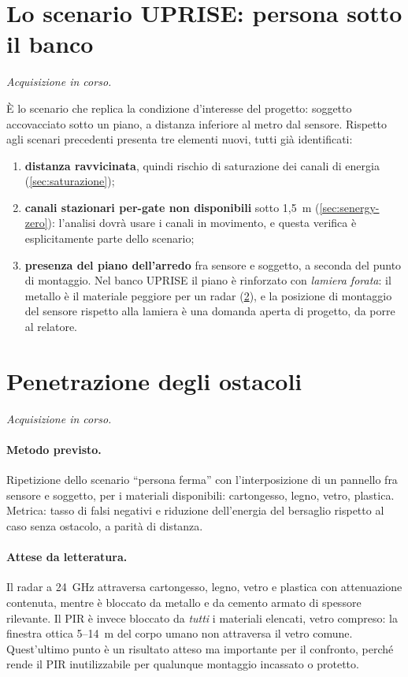 \section{Lo scenario UPRISE: persona sotto il banco}
\label{sec:sotto-banco}

\emph{Acquisizione in corso.}

È lo scenario che replica la condizione d'interesse del progetto: soggetto
accovacciato sotto un piano, a distanza inferiore al metro dal sensore. Rispetto
agli scenari precedenti presenta tre elementi nuovi, tutti già identificati:

\begin{enumerate}[leftmargin=1.8em,itemsep=3pt]
  \item \textbf{distanza ravvicinata}, quindi rischio di saturazione dei canali di
        energia (\cref{sec:saturazione});
  \item \textbf{canali stazionari per-gate non disponibili} sotto 1,5~m
        (\cref{sec:senergy-zero}): l'analisi dovrà usare i canali in movimento,
        e questa verifica è esplicitamente parte dello scenario;
  \item \textbf{presenza del piano dell'arredo} fra sensore e soggetto, a seconda
        del punto di montaggio. Nel banco UPRISE il piano è rinforzato con
        \emph{lamiera forata}: il metallo è il materiale peggiore per un radar
        (\cref{sec:ostacoli}), e la posizione di montaggio del sensore rispetto alla
        lamiera è una domanda aperta di progetto, da porre al relatore.
\end{enumerate}

\section{Penetrazione degli ostacoli}
\label{sec:ostacoli}

\emph{Acquisizione in corso.}

\paragraph{Metodo previsto.} Ripetizione dello scenario ``persona ferma'' con
l'interposizione di un pannello fra sensore e soggetto, per i materiali disponibili:
cartongesso, legno, vetro, plastica. Metrica: tasso di falsi negativi e riduzione
dell'energia del bersaglio rispetto al caso senza ostacolo, a parità di distanza.

\paragraph{Attese da letteratura.} Il radar a 24~GHz attraversa cartongesso, legno,
vetro e plastica con attenuazione contenuta, mentre è bloccato da metallo e da
cemento armato di spessore rilevante. Il PIR è invece bloccato da \emph{tutti} i
materiali elencati, vetro compreso: la finestra ottica 5--14~\textmu m del corpo
umano non attraversa il vetro comune. Quest'ultimo punto è un risultato atteso ma
importante per il confronto, perché rende il PIR inutilizzabile per qualunque
montaggio incassato o protetto.

